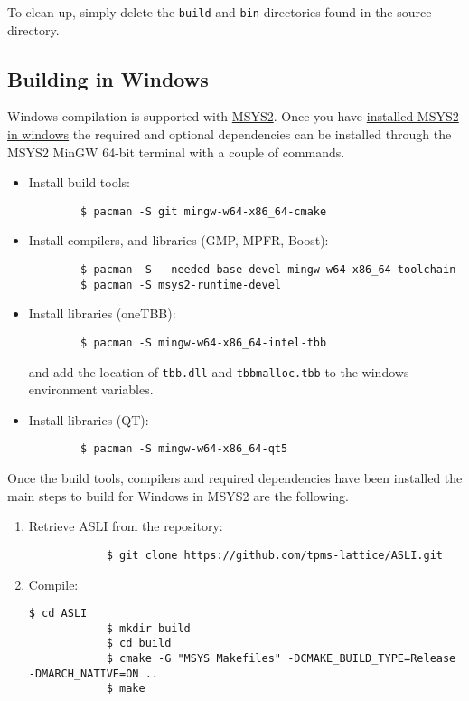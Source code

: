 To clean up, simply delete the \texttt{build} and \texttt{bin} directories found in the source directory.

\subsection{Building \asli{} in Windows}\label{sec:buildWin}
Windows compilation is supported with \href{https://www.msys2.org/}{MSYS2}. Once you have \href{https://www.msys2.org/#installation}{installed MSYS2 in windows} the required and optional dependencies can be installed through the MSYS2 MinGW 64-bit terminal with a couple of commands.

\begin{itemize}
	\item Install build tools:  
	\begin{verbatim}
		$ pacman -S git mingw-w64-x86_64-cmake
	\end{verbatim}

	\item Install compilers, and libraries (GMP, MPFR, Boost):  
	\begin{verbatim}
		$ pacman -S --needed base-devel mingw-w64-x86_64-toolchain
		$ pacman -S msys2-runtime-devel
	\end{verbatim}

	\item Install libraries (oneTBB):
	\begin{verbatim}
		$ pacman -S mingw-w64-x86_64-intel-tbb
	\end{verbatim}
	and add the location of \texttt{tbb.dll} and \texttt{tbbmalloc.tbb} to the windows environment variables.

	\item Install libraries (QT):
	\begin{verbatim}
		$ pacman -S mingw-w64-x86_64-qt5
	\end{verbatim}
\end{itemize}

Once the build tools, compilers and required dependencies have been installed the main steps to build \asli{} for Windows in MSYS2 are the following.
\begin{enumerate}
	\item Retrieve ASLI from the repository:
		\begin{verbatim}
			$ git clone https://github.com/tpms-lattice/ASLI.git
		\end{verbatim}
	\item Compile:
		\begin{Verbatim}[breaklines=true, tabsize=0]
			$ cd ASLI
			$ mkdir build
			$ cd build
			$ cmake -G "MSYS Makefiles" -DCMAKE_BUILD_TYPE=Release -DMARCH_NATIVE=ON ..
			$ make
		\end{Verbatim}
\end{enumerate}

